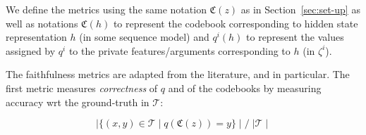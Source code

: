 We define the metrics using the same notation  $\mathfrak{C}(z)$ as in Section~\ref{sec:set-up} 
as well as 
notations $\mathfrak{C}(h)$
to represent the codebook corresponding to
hidden state representation $h$ (in some sequence model)
and $q^i(h)$ to represent the values assigned by $q^i$ 
to the %
private features/arguments corresponding to
$h$ (in $\zeta^i$).


The faithfulness metrics are adapted from the literature, and \cite{kori2022explaining} in particular.
The
first metric measures \emph{correctness} of $q$ and of the codebooks
by measuring accuracy %
wrt the ground-truth in $\mathcal{T}$:
\vspace*{-0.1cm}
      \iffalse   \[
             \frac{ \mid \{ %
            (x,y) \in \mathcal{T} \mid q(\mathfrak{C}(%
            z)) = y %
             \} \mid }{ \mid \mathcal{T} \mid }
        \]
\fi 
        \[
        \mid \{ %
            (x,y) \in \mathcal{T} \mid q(\mathfrak{C}(%
            z)) = y %
             \} \mid / \; { \mid \mathcal{T} \mid }
        \]

